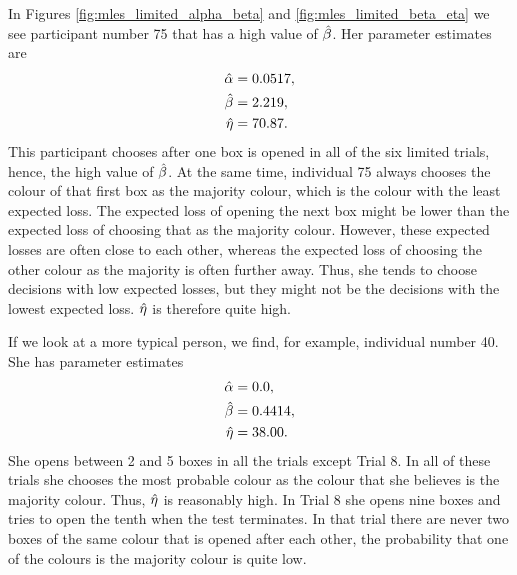 In Figures \ref{fig:mles_limited_alpha_beta} and \ref{fig:mles_limited_beta_eta} we see participant number 75 that has a high value of $\hat{\beta}$. Her parameter estimates are
\begin{equation}
\label{mles_lim_person75}
    \begin{aligned}
        \hat{\alpha} &= 0.0517,\\
        \hat{\beta} &= 2.219,\\
        \hat{\eta} &= 70.87.
    \end{aligned}
\end{equation}
This participant chooses after one box is opened in all of the six limited trials, hence, the high value of $\hat{\beta}$. At the same time, individual 75 always chooses the colour of that first box as the majority colour, which is the colour with the least expected loss. The expected loss of opening the next box might be lower than the expected loss of choosing that as the majority colour. However, these expected losses are often close to each other, whereas the expected loss of choosing the other colour as the majority is often further away. Thus, she tends to choose decisions with low expected losses, but they might not be the decisions with the lowest expected loss. $\hat{\eta}$ is therefore quite high.

If we look at a more typical person, we find, for example, individual number 40. She has parameter estimates
\begin{equation}
\label{mles_lim_person40}
    \begin{aligned}
        \hat{\alpha} &= 0.0,\\
        \hat{\beta} &= 0.4414,\\
        \hat{\eta} &= 38.00.
    \end{aligned}
\end{equation}
She opens between 2 and 5 boxes in all the trials except Trial 8. In all of these trials she chooses the most probable colour as the colour that she believes is the majority colour. Thus, $\hat{\eta}$ is reasonably high. In Trial 8 she opens nine boxes and tries to open the tenth when the test terminates. In that trial there are never two boxes of the same colour that is opened after each other, the probability that one of the colours is the majority colour is quite low. 









